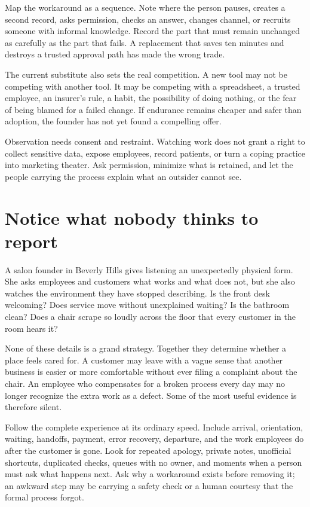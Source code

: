 Map the workaround as a sequence. Note where the person pauses, creates a
second record, asks permission, checks an answer, changes channel, or recruits
someone with informal knowledge. Record the part that must remain unchanged as
carefully as the part that fails. A replacement that saves ten minutes and
destroys a trusted approval path has made the wrong trade.

The current substitute also sets the real competition. A new tool may not be
competing with another tool. It may be competing with a spreadsheet, a trusted
employee, an insurer's rule, a habit, the possibility of doing nothing, or the
fear of being blamed for a failed change. If endurance remains cheaper and
safer than adoption, the founder has not yet found a compelling offer.

Observation needs consent and restraint. Watching work does not grant a right
to collect sensitive data, expose employees, record patients, or turn a coping
practice into marketing theater. Ask permission, minimize what is retained,
and let the people carrying the process explain what an outsider cannot see.

\section{Notice what nobody thinks to report}

A salon founder in Beverly Hills gives listening an unexpectedly physical
form. She asks employees and customers what works and what does not, but she
also watches the environment they have stopped describing. Is the front desk
welcoming? Does service move without unexplained waiting? Is the bathroom
clean? Does a chair scrape so loudly across the floor that every customer in
the room hears it?

None of these details is a grand strategy. Together they determine whether a
place feels cared for. A customer may leave with a vague sense that another
business is easier or more comfortable without ever filing a complaint about
the chair. An employee who compensates for a broken process every day may no
longer recognize the extra work as a defect. Some of the most useful evidence
is therefore silent.

Follow the complete experience at its ordinary speed. Include arrival,
orientation, waiting, handoffs, payment, error recovery, departure, and the
work employees do after the customer is gone. Look for repeated apology,
private notes, unofficial shortcuts, duplicated checks, queues with no owner,
and moments when a person must ask what happens next. Ask why a workaround
exists before removing it; an awkward step may be carrying a safety check or a
human courtesy that the formal process forgot.

